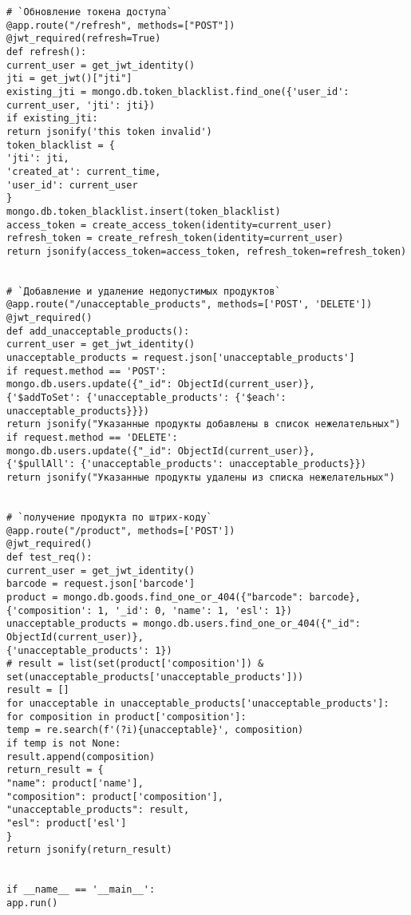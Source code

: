 \begin{lstlisting}
# `Обновление токена доступа`
@app.route("/refresh", methods=["POST"])
@jwt_required(refresh=True)
def refresh():
current_user = get_jwt_identity()
jti = get_jwt()["jti"]
existing_jti = mongo.db.token_blacklist.find_one({'user_id': current_user, 'jti': jti})
if existing_jti:
return jsonify('this token invalid')
token_blacklist = {
'jti': jti,
'created_at': current_time,
'user_id': current_user
}
mongo.db.token_blacklist.insert(token_blacklist)
access_token = create_access_token(identity=current_user)
refresh_token = create_refresh_token(identity=current_user)
return jsonify(access_token=access_token, refresh_token=refresh_token)


# `Добавление и удаление недопустимых продуктов`
@app.route("/unacceptable_products", methods=['POST', 'DELETE'])
@jwt_required()
def add_unacceptable_products():
current_user = get_jwt_identity()
unacceptable_products = request.json['unacceptable_products']
if request.method == 'POST':
mongo.db.users.update({"_id": ObjectId(current_user)},
{'$addToSet': {'unacceptable_products': {'$each': unacceptable_products}}})
return jsonify("Указанные продукты добавлены в список нежелательных")
if request.method == 'DELETE':
mongo.db.users.update({"_id": ObjectId(current_user)},
{'$pullAll': {'unacceptable_products': unacceptable_products}})
return jsonify("Указанные продукты удалены из списка нежелательных")


# `получение продукта по штрих-коду`
@app.route("/product", methods=['POST'])
@jwt_required()
def test_req():
current_user = get_jwt_identity()
barcode = request.json['barcode']
product = mongo.db.goods.find_one_or_404({"barcode": barcode},
{'composition': 1, '_id': 0, 'name': 1, 'esl': 1})
unacceptable_products = mongo.db.users.find_one_or_404({"_id": ObjectId(current_user)},
{'unacceptable_products': 1})
# result = list(set(product['composition']) & set(unacceptable_products['unacceptable_products']))
result = []
for unacceptable in unacceptable_products['unacceptable_products']:
for composition in product['composition']:
temp = re.search(f'(?i){unacceptable}', composition)
if temp is not None:
result.append(composition)
return_result = {
"name": product['name'],
"composition": product['composition'],
"unacceptable_products": result,
"esl": product['esl']
}
return jsonify(return_result)


if __name__ == '__main__':
app.run()
\end{lstlisting}
\clearpage